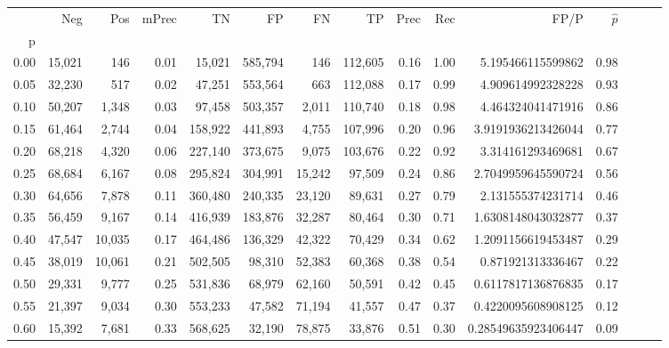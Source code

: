 \begin{tabular}{rrrrrrrrrrrrrrr}
\toprule
{} &     Neg &     Pos & mPrec &       TN &       FP &       FN &       TP &  Prec &   Rec &                  FP/P & $\hat{p}$ \\
p    &         &         &       &          &          &          &          &       &       &                       &           \\
\midrule
0.00 &  15,021 &     146 &  0.01 &   15,021 &  585,794 &      146 &  112,605 &  0.16 &  1.00 &     5.195466115599862 &      0.98 \\
0.05 &  32,230 &     517 &  0.02 &   47,251 &  553,564 &      663 &  112,088 &  0.17 &  0.99 &     4.909614992328228 &      0.93 \\
0.10 &  50,207 &   1,348 &  0.03 &   97,458 &  503,357 &    2,011 &  110,740 &  0.18 &  0.98 &     4.464324041471916 &      0.86 \\
0.15 &  61,464 &   2,744 &  0.04 &  158,922 &  441,893 &    4,755 &  107,996 &  0.20 &  0.96 &    3.9191936213426044 &      0.77 \\
0.20 &  68,218 &   4,320 &  0.06 &  227,140 &  373,675 &    9,075 &  103,676 &  0.22 &  0.92 &     3.314161293469681 &      0.67 \\
0.25 &  68,684 &   6,167 &  0.08 &  295,824 &  304,991 &   15,242 &   97,509 &  0.24 &  0.86 &    2.7049959645590724 &      0.56 \\
0.30 &  64,656 &   7,878 &  0.11 &  360,480 &  240,335 &   23,120 &   89,631 &  0.27 &  0.79 &     2.131555374231714 &      0.46 \\
0.35 &  56,459 &   9,167 &  0.14 &  416,939 &  183,876 &   32,287 &   80,464 &  0.30 &  0.71 &    1.6308148043032877 &      0.37 \\
0.40 &  47,547 &  10,035 &  0.17 &  464,486 &  136,329 &   42,322 &   70,429 &  0.34 &  0.62 &    1.2091156619453487 &      0.29 \\
0.45 &  38,019 &  10,061 &  0.21 &  502,505 &   98,310 &   52,383 &   60,368 &  0.38 &  0.54 &     0.871921313336467 &      0.22 \\
0.50 &  29,331 &   9,777 &  0.25 &  531,836 &   68,979 &   62,160 &   50,591 &  0.42 &  0.45 &    0.6117817136876835 &      0.17 \\
0.55 &  21,397 &   9,034 &  0.30 &  553,233 &   47,582 &   71,194 &   41,557 &  0.47 &  0.37 &    0.4220095608908125 &      0.12 \\
0.60 &  15,392 &   7,681 &  0.33 &  568,625 &   32,190 &   78,875 &   33,876 &  0.51 &  0.30 &   0.28549635923406447 &      0.09 \\

\end{tabular}
